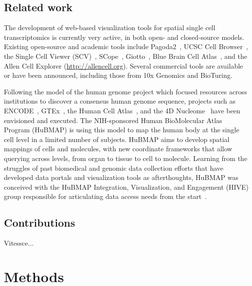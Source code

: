 \documentclass[12pt, letterpaper]{article}
\begin{document}
\subsection{Related work}
The development of web-based visualization tools for spatial single cell transcriptomics is currently very active, in both open- and closed-source models.
Existing open-source and academic tools include Pagoda2~\cite{lake2018integrative}, UCSC Cell Browser~\cite{nowakowski2017spatiotemporal}, the Single Cell Viewer (SCV)~\cite{wang2019single}, SCope~\cite{wouters2019single}, Giotto~\cite{dries2019giotto}, Blue Brain Cell Atlas~\cite{ero2019cell}, and the Allen Cell Explorer (\url{http://allencell.org}).
Several commercial tools are available or have been announced, including those from 10x Genomics and BioTuring.


Following the model of the human genome project which focused resources across institutions to discover a consensus human genome sequence, projects such as ENCODE~\cite{encode2004encode}, GTEx~\cite{lonsdale2013genotype}, the Human Cell Atlas~\cite{regev2017science}, and the 4D Nucleome~\cite{dekker20174d} have been envisioned and executed.
The NIH-sponsored Human BioMolecular Atlas Program (HuBMAP) is using this model to map the human body at the single cell level in a limited number of subjects.
HuBMAP aims to develop spatial mappings of cells and molecules, with new coordinate frameworks that allow querying across levels, from organ to tissue to cell to molecule.
Learning from the struggles of past biomedical and genomic data collection efforts that have developed data portals and visualization tools as afterthoughts, HuBMAP was conceived with the HuBMAP Integration, Visualization, and Engagement (HIVE) group responsible for articulating data access needs from the start~\cite{snyder2019mapping}.




\subsection{Contributions}
Vitessce...

\section{Methods}
\end{document}
